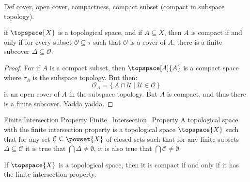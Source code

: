     Def cover, open cover, compactness, compact subset
    (compact in subspace topology).
    \begin{theorem}
        if $\topspace{X}$ is a topological space, and if $A\subseteq{X}$,
        then $A$ is compact if and only if for every subset
        $\mathcal{O}\subseteq\tau$ such that $\mathcal{O}$ is a cover of
        $A$, there is a finite subcover $\Delta\subseteq\mathcal{O}$.
    \end{theorem}
    \begin{proof}
        For if $A$ is a compact subset, then $\topspace[A]{A}$ is a compact
        space where $\tau_{A}$ is the subspace topology. But then:
        \begin{equation}
            \mathcal{O}_{A}=\{\,A\cap\mathcal{U}\;|\;
                \mathcal{U}\in\mathcal{O}\,\}
        \end{equation}
        is an open cover of $A$ in the subspace topology. But $A$ is
        compact, and thus there is a finite subcover. Yadda yadda.
    \end{proof}
    \begin{fdefinition}{Finite Intersection Property}
                       {Finite_Intersection_Property}
        A topological space with the finite intersection property is a
        topological space $\topspace{X}$ such that for any set
        $\mathcal{C}\subseteq\powset{X}$ of closed sets such that for any
        finite subsets $\Delta\subseteq\mathcal{C}$ it is true that
        $\bigcap\Delta\ne\emptyset$, it is also true that
        $\bigcap\mathcal{C}\ne\emptyset$.
    \end{fdefinition}
    \begin{theorem}
        If $\topspace{X}$ is a topological space, then it is compact if and
        only if it has the finite intersection property.
    \end{theorem}
